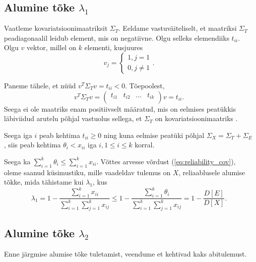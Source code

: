 \documentclass[a4paper,12pt,oneside]{article}
\numberwithin{equation}{section}
\theoremstyle{definition}
\begin{document}
\subsection{Alumine tõke $\lambda_1$}

Vaatleme kovariatsioonimaatriksit $\Sigma_T$. Eeldame vastuväiteliselt, et maatriksi $\Sigma_T$ peadiagonaalil leidub element, mis on negatiivne. Olgu selleks elemendiiks  $t_{ii}$. Olgu $v$ vektor, millel on $k$ elementi, kusjuures 
\begin{equation*}
v_j =
\begin{cases}
1, j = 1 \\
0, j \neq 1
\end{cases} 
\text{.}
\end{equation*} 

Paneme tähele, et n\"u\"ud $v^T \Sigma_T v = t_{ii} < 0$. Tõepoolest,
\begin{equation*}
v^T \Sigma_T v = 
\begin{pmatrix}
t_{i1} & t_{i2} &  \hdots & t_{ik}\\
\end{pmatrix} v = t_{ii} \text{.}
\end{equation*} Seega ei ole maatriks enam positiivselt määratud, mis on eelmises peatükkis läbiviidud arutelu põhjal vastuolus sellega, et $\Sigma_T$ on kovariatsioonimaatriks .

Seega iga $i$ peab kehtima $t_{ii} \geq 0$ ning kuna eelmise peatüki põhjal $\Sigma_X = \Sigma_T + \Sigma_E$, siis peab kehtima $\theta_i < x_{ii}$ iga $i, 1 \leq i \leq k$ korral.

Seega ka $\sum \limits_{i=1}^k \theta_i \leq \sum \limits_{i=1}^k x_{ii}$. Võttes arvesse võrdust (\ref{eq:reliability_cov}), oleme saanud küsimustiku, mille vaadeldav tulemus on $X$,  reliaablusele alumise tõkke, mida tähistame kui $\lambda_1$, kus
\begin{equation}
\label{eq:lambda_1}
\lambda_1 = 1 - \frac{ \sum \limits_{i=1}^k {x}_{ii}}{ \sum \limits_{i=1}^k \sum \limits_{j=1}^k {x}_{ij}} \leq  1 - \frac{ \sum \limits_{i=1}^k  {\theta}_{i}}{ \sum \limits_{i=1}^k \sum \limits_{j=1}^k {x}_{ij}} =  1 - \frac{D \left[ E \right]}{D \left[ X \right]}.
\end{equation} 

\subsection{Alumine tõke $\lambda_2$}

Enne järgmise alumise tõke tuletamist, veendume et kehtivad kaks abitulemust.
\end{document}
